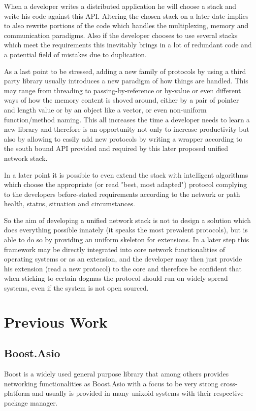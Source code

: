 \documentclass[twocolumn,english]{IEEEtran}
\theoremstyle{plain}
\theoremstyle{plain}
\begin{document}
When a developer writes a distributed application he will choose a stack and
write his code against this API. Altering the chosen stack on a later date
implies to also rewrite portions of the code which handles the multiplexing,
memory and communication paradigms. Also if the developer chooses to use
several stacks which meet the requirements this inevitably brings in a lot of
redundant code and a potential field of mistakes due to duplication.

As a last point to be stressed, adding a new family of protocols by using a
third party library usually introduces a new paradigm of how things are
handled. This may range from threading to passing-by-reference or by-value or
even different ways of how the memory content is shoved around, either by a
pair of pointer and length value or by an object like a vector, or even
non-uniform function/method naming. This all increases the time a developer
needs to learn a new library and therefore is an opportunity not only to
increase productivity but also by allowing to easily add new protocols by
writing a wrapper according to the south bound API provided and required by
this later proposed unified network stack.

In a later point it is possible to even extend the stack with intelligent
algorithms which choose the appropriate (or read "best, most adapted")
protocol complying to the developers before-stated requirements according to
the network or path health, status, situation and circumstances.

So the aim of developing a unified network stack is not to design a solution
which does everything possible innately (it speaks the most prevalent
protocols), but is able to do so by providing an uniform skeleton for
extensions. In a later step this framework may be directly integrated into
core network functionalities of operating systems or as an extension, and the
developer may then just provide his extension (read a new protocol) to the
core and therefore be confident that when sticking to certain dogmas the
protocol should run on widely spread systems, even if the system is not open
sourced.

\section{Previous Work}

\subsection{Boost.Asio\cite{boost.asio}}
Boost is a widely used general purpose library that among others provides
networking functionalities as Boost.Asio with a focus to be very strong
cross-platform and usually is provided in many unixoid systems with their
respective package manager.
\end{document}
